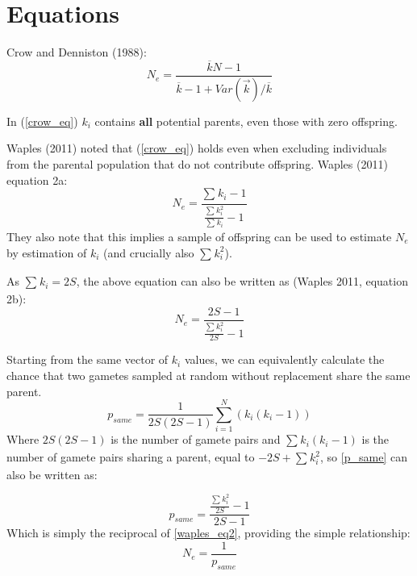 \documentclass{article}
\begin{document}
\section*{Equations}
\begin{description}

\item Crow and Denniston (1988):
\begin{equation} \label{crow_eq}
N_e = \dfrac{\overline{k} N - 1}{\overline{k}-1+ Var(\overrightarrow{k})/\overline{k}} 
\end{equation}

In (\ref{crow_eq}) $k_i$ contains \textbf{all} potential parents, even those with zero offspring.
\item Waples (2011) noted that (\ref{crow_eq}) holds even when excluding individuals from the parental population that do not contribute offspring. Waples (2011) equation 2a:
\begin{equation} \label{waples_eq}
 N_e = \frac{\sum_{}^{} k_i - 1}{\frac{\sum_{}^{} k_i^2}{\sum_{}^{} k_i} -1 } 
\end{equation}
They also note that this implies a sample of offspring can be used to estimate $N_e$ by estimation of $k_i$ (and crucially also $\sum_{}^{} k_i^2$). 

As $\sum_{}^{} k_i = 2S$, the above equation can also be written as (Waples 2011, equation 2b):
\begin{equation} \label{waples_eq2}
 N_e = \frac{2S - 1}{\frac{\sum_{}^{} k_i^2}{2S} -1 } 
\end{equation}

Starting from the same vector of $k_i$ values, we can equivalently calculate the chance that two gametes sampled at random without replacement share the same parent. 
\begin{equation} \label{p_same}
p_{same} = \frac{1}{2S(2S-1)} \sum_{i=1}^{N} (k_i(k_i-1))
\end{equation}
Where $2S(2S-1)$ is the number of gamete pairs and 
$\sum_{}{} k_i(k_i-1)$ is the number of gamete pairs sharing a parent, equal to $-2S + \sum_{}^{} k_i^2$, so \ref{p_same} can also be written as: 

\begin{equation}
p_{same} = \frac{\frac{\sum_{}^{} k_i^2}{2S}-1}{2S-1}
\end{equation}
Which is simply the reciprocal of \ref{waples_eq2}, providing the simple relationship:
\begin{equation} \label{simple_eq} 
N_e = \frac{1}{p_{same}}
\end{equation}


\end{description}
\end{document}

